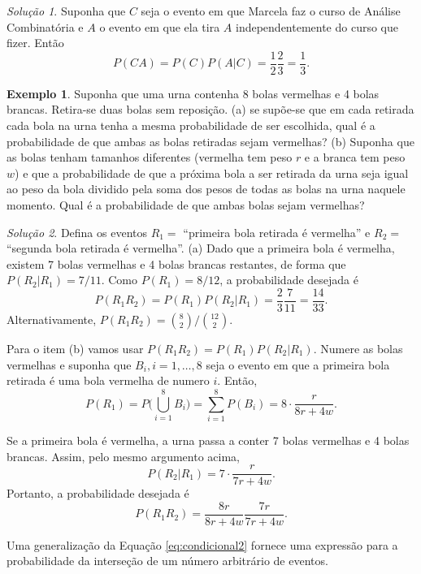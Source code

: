 \documentclass[]{book}
\theoremstyle{definition}
\theoremstyle{definition}
\newtheorem{example}{Exemplo}[chapter]
\theoremstyle{definition}
\theoremstyle{remark}
\newtheorem*{solution}{Solução}
\begin{document}
\begin{solution}
\iffalse{} {Solução. } \fi{}Suponha que \(C\) seja o evento em que Marcela faz o curso de Análise Combinatória e \(A\) o evento em que ela tira \(A\) independentemente do curso que fizer.
Então
\[P(CA) = P(C)P(A|C) = \frac{1}{2}\frac{2}{3} = \frac{1}{3}.\]
\end{solution}

\begin{example}
\protect\hypertarget{exm:unnamed-chunk-150}{}{\label{exm:unnamed-chunk-150} }Suponha que uma urna contenha 8 bolas vermelhas e 4 bolas brancas.
Retira-se duas bolas sem reposição.
(a) se supõe-se que em cada retirada cada bola na urna tenha a mesma probabilidade de ser escolhida, qual é a probabilidade de que ambas as bolas retiradas sejam vermelhas?
(b) Suponha que as bolas tenham tamanhos diferentes (vermelha tem peso \(r\) e a branca tem peso \(w\)) e que a probabilidade de que a próxima bola a ser retirada da urna seja igual ao peso da bola dividido pela soma dos pesos de todas as bolas na urna naquele momento.
Qual é a probabilidade de que ambas bolas sejam vermelhas?
\end{example}

\begin{solution}
\iffalse{} {Solução. } \fi{}Defina os eventos \(R_1 =\) ``primeira bola retirada é vermelha'' e \(R_2 =\) ``segunda bola retirada é vermelha''.
(a) Dado que a primeira bola é vermelha, existem 7 bolas vermelhas e 4 bolas brancas restantes, de forma que \(P(R_2|R_1) = 7/11\).
Como \(P(R_1)=8/12\), a probabilidade desejada é
\[P(R_1 R_2) = P(R_1)P(R_2|R_1) = \frac{2}{3}\frac{7}{11} = \frac{14}{33}.\]
Alternativamente, \(P(R_1 R_2) = {{8\choose 2}}/{{12\choose 2}}\).

Para o item (b) vamos usar \(P(R_1 R_2) = P(R_1)P(R_2 | R_1)\).
Numere as bolas vermelhas e suponha que \(B_i, i=1, \ldots, 8\) seja o evento em que a primeira bola retirada é uma bola vermelha de numero \(i\).
Então,
\[P(R_1) = P\Bigg(\bigcup_{i=1}^{8}B_i\Bigg) = \sum_{i=1}^{8}P(B_i) = 8\cdot \frac{r}{8r+4w}.\]

Se a primeira bola é vermelha, a urna passa a conter 7 bolas vermelhas e 4 bolas brancas.
Assim, pelo mesmo argumento acima,
\[P(R_2 | R_1) = 7\cdot \frac{r}{7r+4w}.\]
Portanto, a probabilidade desejada é
\[P(R_1 R_2) = \frac{8r}{8r+4w}\frac{7r}{7r+4w}.\]
\end{solution}

Uma generalização da Equação \eqref{eq:condicional2} fornece uma expressão para a probabilidade da interseção de um número arbitrário de eventos.
\end{document}
